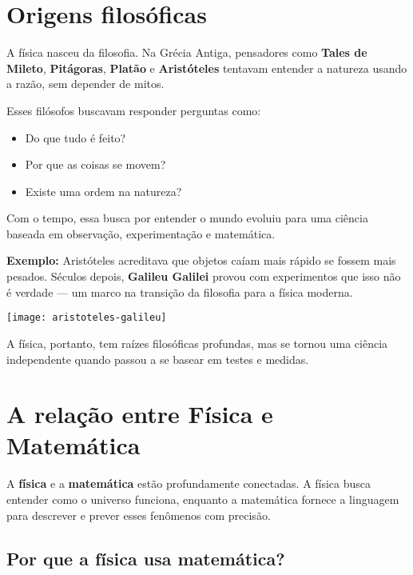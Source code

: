 \documentclass[portuguese,11pt,a4paper,oneside, openany]{article}
\begin{document}
	\section{Origens filosóficas}
	
	A física nasceu da filosofia. Na Grécia Antiga, pensadores como \textbf{Tales de Mileto}, \textbf{Pitágoras}, \textbf{Platão} e \textbf{Aristóteles} tentavam entender a natureza usando a razão, sem depender de mitos.
	
	Esses filósofos buscavam responder perguntas como:
	
	\begin{itemize}
		\item Do que tudo é feito?
		\item Por que as coisas se movem?
		\item Existe uma ordem na natureza?
	\end{itemize}
	
	Com o tempo, essa busca por entender o mundo evoluiu para uma ciência baseada em observação, experimentação e matemática.
	
	\textbf{Exemplo:} Aristóteles acreditava que objetos caíam mais rápido se fossem mais pesados. Séculos depois, \textbf{Galileu Galilei} provou com experimentos que isso não é verdade — um marco na transição da filosofia para a física moderna.
	
	\begin{center}
		\texttt{[image: aristoteles-galileu]}
	\end{center}
	
	A física, portanto, tem raízes filosóficas profundas, mas se tornou uma ciência independente quando passou a se basear em testes e medidas.
	
	
	
	\section{A relação entre \textbf{Física} e \textbf{Matemática}}
	
	A \textbf{física} e a \textbf{matemática} estão profundamente conectadas. A física busca entender como o universo funciona, enquanto a matemática fornece a linguagem para descrever e prever esses fenômenos com precisão.
	
	\subsection*{Por que a física usa matemática?}
	
\end{document}

